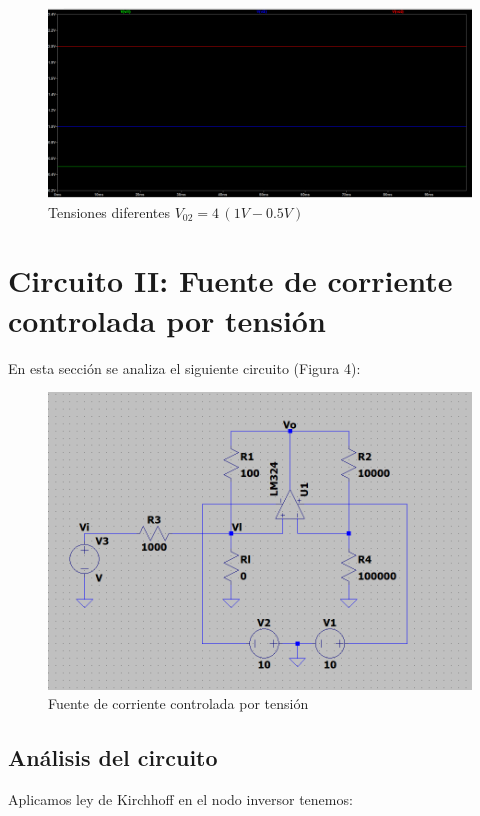 \documentclass[12pt]{article}
\begin{document}
		\begin{figure}[h]
			\centering
			\includegraphics[width=1\linewidth]{Simulaciones-Resultados/Circuito1_Vo2-Vi1-Vi2}
			\caption{Tensiones diferentes $V_{02}=4\,(1V-0.5V)$}
			\label{fig:circuito1vo2-vi1-vi2}
		\end{figure}
			
	\section {Circuito II: Fuente de corriente controlada por tensión}
		En esta sección se analiza el siguiente circuito (Figura 4):
		
		\begin{figure}[h]
			\centering
			\includegraphics[width=1\linewidth]{Simulaciones-Resultados/Circuito2_esquematico}
			\caption{Fuente de corriente controlada por tensión}
			\label{fig:circuito2esquematico}
		\end{figure}
		\subsection{Análisis del circuito}
		Aplicamos ley de Kirchhoff en el nodo inversor tenemos:
		
\end{document}
